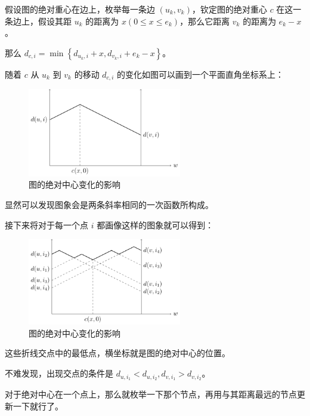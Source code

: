 \documentclass{cumcmthesis}
\begin{document}
假设图的绝对重心在边上，枚举每一条边 $(u_k,v_k)$，钦定图的绝对重心 $c$ 在这一条边上，假设其距 $u_k$ 的距离为 $x(0 \le x \le e_k)$，那么它距离 $v_k$ 的距离为 $e_k - x$。

那么 $d_{c,i} = \min\left\{d_{u_k, i} + x, d_{v_k,i} + e_k - x\right\}$。

随着 $c$ 从 $u_k$ 到 $v_k$ 的移动 $d_{c,i}$ 的变化如图可以画到一个平面直角坐标系上：

\begin{figure}[H]
	\centering
	\includegraphics[width=0.6\textwidth,height=0.4\textwidth]{images/mdst-plot1.png}
	\caption{图的绝对中心变化的影响}
	\label{fig:mdst-graph}
\end{figure}

显然可以发现图象会是两条斜率相同的一次函数所构成。

接下来将对于每一个点 $i$ 都画像这样的图象就可以得到：

\begin{figure}[H]
	\centering
	\includegraphics[width=0.6\textwidth,height=0.4\textwidth]{images/mdst-plot2.png}
	\caption{图的绝对中心变化的影响}
	\label{fig:mdst-graph}
\end{figure}

这些折线交点中的最低点，横坐标就是图的绝对中心的位置。

不难发现，出现交点的条件是 $d_{u,i_1} < d_{u,i_2},d_{v,i_1} > d_{v,i_2}$。

对于绝对中心在一个点上，那么就枚举一下那个节点，再用与其距离最远的节点更新一下就行了。
\end{document}

